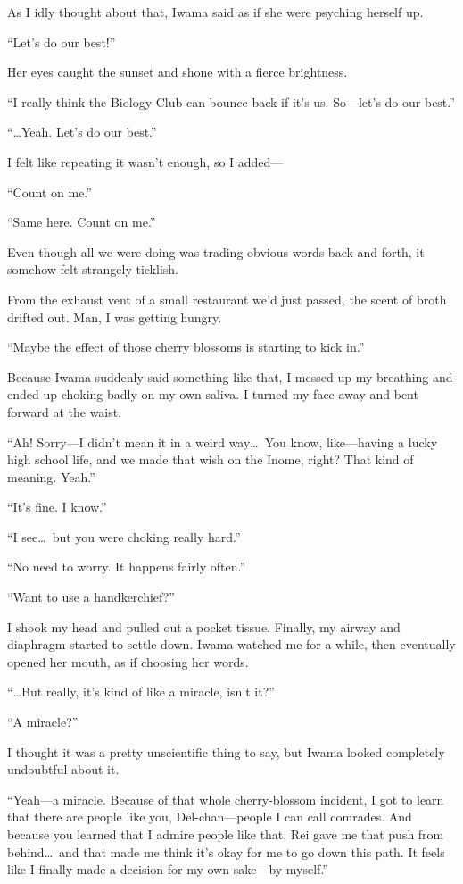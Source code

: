 \documentclass[
    a4paper,
    12pt,
    twoside,
    openany,
    UTF8,
    fontset=windows
]{ctexbook}
\begin{document}
As I idly thought about that, Iwama said as if she were psyching herself up.

``Let's do our best!''

Her eyes caught the sunset and shone with a fierce brightness.

``I really think the Biology Club can bounce back if it's us. So---let's do our best.''

``\dots Yeah. Let's do our best.''

I felt like repeating it wasn't enough, so I added---

``Count on me.''

``Same here. Count on me.''

Even though all we were doing was trading obvious words back and forth, it somehow felt strangely ticklish.

From the exhaust vent of a small restaurant we'd just passed, the scent of broth drifted out. Man, I was getting hungry.

``Maybe the effect of those cherry blossoms is starting to kick in.''

Because Iwama suddenly said something like that, I messed up my breathing and ended up choking badly on my own saliva. I turned my face away and bent forward at the waist.

``Ah! Sorry---I didn't mean it in a weird way\dots\ You know, like---having a lucky high school life, and we made that wish on the Inome, right? That kind of meaning. Yeah.''

``It's fine. I know.''

``I see\dots\ but you were choking really hard.''

``No need to worry. It happens fairly often.''

``Want to use a handkerchief?''

I shook my head and pulled out a pocket tissue. Finally, my airway and diaphragm started to settle down. Iwama watched me for a while, then eventually opened her mouth, as if choosing her words.

``\dots But really, it's kind of like a miracle, isn't it?''

``A miracle?''

I thought it was a pretty unscientific thing to say, but Iwama looked completely undoubtful about it.

``Yeah---a miracle. Because of that whole cherry-blossom incident, I got to learn that there are people like you, Del-chan---people I can call comrades. And because you learned that I admire people like that, Rei gave me that push from behind\dots\ and that made me think it's okay for me to go down this path. It feels like I finally made a decision for my own sake---by myself.''
\end{document}
